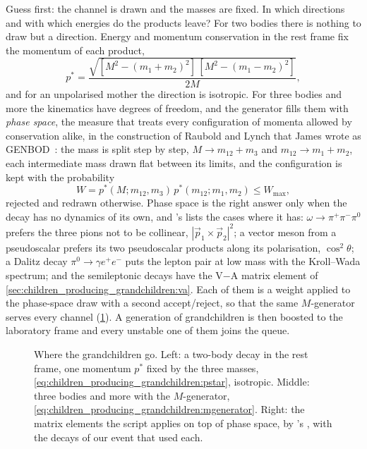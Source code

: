 Guess first: the channel is drawn and the masses are fixed. In which
directions and with which energies do the products leave? For two bodies
there is nothing to draw but a direction. Energy and momentum conservation
in the rest frame fix the momentum of each product,
\begin{equation}
  p^*=\frac{\sqrt{[M^2-(m_1+m_2)^2]\,[M^2-(m_1-m_2)^2]}}{2M},
  \label{eq:children_producing_grandchildren:pstar}
\end{equation}
and for an unpolarised mother the direction is isotropic. For three bodies
and more the kinematics have degrees of freedom, and the generator fills
them with \emph{phase space}, the measure that treats every configuration
of momenta allowed by conservation alike, in the construction of Raubold
and Lynch that James wrote as GENBOD~\cite{James:1968gu}: the mass is
split step by step, $M\to m_{12}+m_3$ and $m_{12}\to m_1+m_2$, each
intermediate mass drawn flat between its limits, and the configuration
is kept with the probability
\begin{equation}
  W=p^*(M;m_{12},m_3)\,p^*(m_{12};m_1,m_2)\le W_{\max},
  \label{eq:children_producing_grandchildren:mgenerator}
\end{equation}
rejected and redrawn otherwise. Phase space is the right answer only when
the decay has no dynamics of its own, and \PYTHIA's  lists
the cases where it has: $\omega\to\pi^+\pi^-\pi^0$ prefers the three pions
not to be collinear, $|\vec p_1\times\vec p_2|^2$; a vector meson from a
pseudoscalar prefers its two pseudoscalar products along its polarisation,
$\cos^2\theta$; a Dalitz decay $\pi^0\to\gamma e^+e^-$ puts the lepton pair
at low mass with the Kroll--Wada spectrum; and the semileptonic decays
have the V$-$A matrix element of
\cref{sec:children_producing_grandchildren:va}. Each of them is a weight
applied to the phase-space draw with a second accept/reject, so that the
same $M$-generator serves every channel
(\cref{fig:children_producing_grandchildren:phasespace_sketch}). A
generation of grandchildren is then boosted to the laboratory frame and
every unstable one of them joins the queue.

\begin{figure}[htbp]\centering
\resizebox{\textwidth}{!}{}
\caption[Two-body decay, the $M$-generator and the matrix-element modes]{Where
the grandchildren go. Left: a two-body decay in the rest frame, one
momentum $p^*$ fixed by the three masses,
\cref{eq:children_producing_grandchildren:pstar}, isotropic. Middle: three
bodies and more with the $M$-generator,
\cref{eq:children_producing_grandchildren:mgenerator}. Right: the matrix
elements the script applies on top of phase space, by \PYTHIA's
, with the decays of our event that used each.}
\label{fig:children_producing_grandchildren:phasespace_sketch}
\end{figure}

